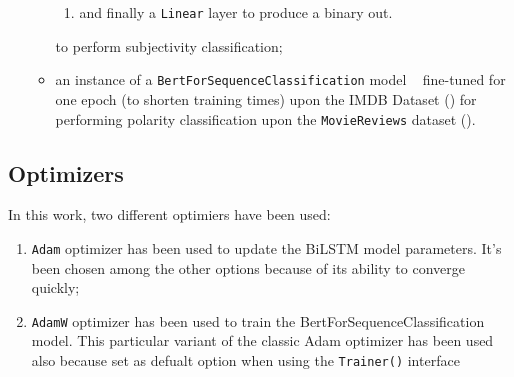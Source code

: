 \begin{itemize}
\begin{itemize}
\begin{enumerate}
                    \item and finally a \texttt{Linear} layer to produce a binary out.

                \end{enumerate}
                to perform subjectivity classification;

            \item an instance of a \texttt{BertForSequenceClassification} model ~\cite{sequence} fine-tuned for one epoch 
                (to shorten training times) upon the IMDB Dataset () for performing polarity classification 
                upon the \texttt{MovieReviews} dataset ().

        \end{itemize}
\end{itemize}

\subsection{Optimizers}
\label{subsec:opt}
In this work, two different optimiers have been used:
\begin{enumerate}
    \item \texttt{Adam} optimizer has been used to update the BiLSTM model parameters. It's been chosen among the other options because of
        its ability to converge quickly;
    \item \texttt{AdamW} optimizer has been used to train the BertForSequenceClassification model. This particular variant of the classic 
        Adam optimizer has been used also because set as defualt option when using the \texttt{Trainer()} interface ~\cite{trainer} 
\end{enumerate}


